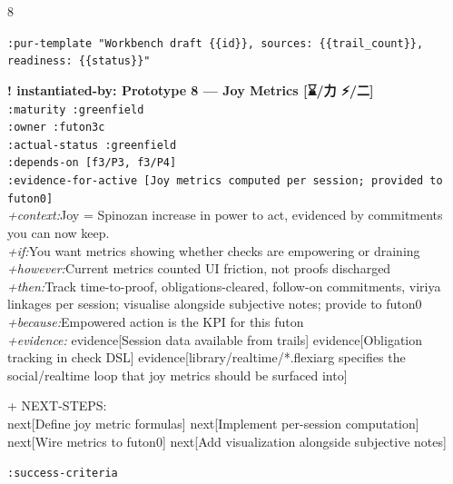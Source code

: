 \documentclass[landscape]{article}
\newcommand{\flexitag}[1]{\textcolor[gray]{0.35}{\textit{#1}}}
\newenvironment{devmapactive}{%
  \def\FrameCommand{\colorbox{devmapactivebg}}%
  \setlength{\fboxsep}{2pt}%
  \MakeFramed{\advance\hsize-\width \FrameRestore}%
}{\endMakeFramed}
\newenvironment{devmapgreenfield}{%
  \def\FrameCommand{\colorbox{devmapgreenfieldbg}}%
  \setlength{\fboxsep}{2pt}%
  \MakeFramed{\advance\hsize-\width \FrameRestore}%
}{\endMakeFramed}
\begin{document}
\begin{paracol}{8}
\begin{devmapactive}
  \texttt{:\allowbreak{}pur-\allowbreak{}template "Workbench draft \{\{id\}\},\allowbreak{} sources:\allowbreak{} \{\{trail\_\allowbreak{}count\}\},\allowbreak{} readiness:\allowbreak{} \{\{status\}\}"}\\
\par
\par
\end{devmapactive}
\begin{devmapgreenfield}
\textbf{! instantiated-by: Prototype 8 — Joy Metrics [⌛️/力 ⚡️/二]}\\
  \texttt{:\allowbreak{}maturity :\allowbreak{}greenfield}\\
  \texttt{:\allowbreak{}owner :\allowbreak{}futon3c}\\
  \texttt{:\allowbreak{}actual-\allowbreak{}status :\allowbreak{}greenfield}\\
  \texttt{:\allowbreak{}depends-\allowbreak{}on [f3/\allowbreak{}P3,\allowbreak{} f3/\allowbreak{}P4]}\\
  \texttt{:\allowbreak{}evidence-\allowbreak{}for-\allowbreak{}active [Joy metrics computed per session;\allowbreak{} provided to futon0]}\\
  \flexitag{+context:}Joy = Spinozan increase in power to act, evidenced by commitments you can now keep.\\
  \flexitag{+if:}You want metrics showing whether checks are empowering or draining\\
  \flexitag{+however:}Current metrics counted UI friction, not proofs discharged\\
  \flexitag{+then:}Track time-to-proof, obligations-cleared, follow-on commitments, viriya linkages per session; visualise alongside subjective notes; provide to futon0\\
  \flexitag{+because:}Empowered action is the KPI for this futon\\
  \flexitag{+evidence:} evidence[Session data available from trails] evidence[Obligation tracking in check DSL] evidence[library/realtime/*.flexiarg specifies the social/realtime loop that joy metrics should be surfaced into]\\
\par
  + NEXT-STEPS:\\
    next[Define joy metric formulas] next[Implement per-session computation] next[Wire metrics to futon0] next[Add visualization alongside subjective notes]\\
\par
  \texttt{:\allowbreak{}success-\allowbreak{}criteria}\\

\end{devmapgreenfield}
\end{paracol}
\end{document}
